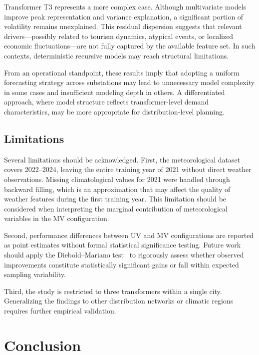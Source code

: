 Transformer T3 represents a more complex case. Although multivariate models improve peak representation and variance explanation, a significant portion of volatility remains unexplained. This residual dispersion suggests that relevant drivers—possibly related to tourism dynamics, atypical events, or localized economic fluctuations—are not fully captured by the available feature set. In such contexts, deterministic recursive models may reach structural limitations.

From an operational standpoint, these results imply that adopting a uniform forecasting strategy across substations may lead to unnecessary model complexity in some cases and insufficient modeling depth in others. A differentiated approach, where model structure reflects transformer-level demand characteristics, may be more appropriate for distribution-level planning.

\subsection*{Limitations}

Several limitations should be acknowledged. First, the meteorological dataset covers 2022--2024, leaving the entire training year of 2021 without direct weather observations. Missing climatological values for 2021 were handled through backward filling, which is an approximation that may affect the quality of weather features during the first training year. This limitation should be considered when interpreting the marginal contribution of meteorological variables in the MV configuration.

Second, performance differences between UV and MV configurations are reported as point estimates without formal statistical significance testing. Future work should apply the Diebold--Mariano test~\cite{DieboldMariano1995} to rigorously assess whether observed improvements constitute statistically significant gains or fall within expected sampling variability.

Third, the study is restricted to three transformers within a single city. Generalizing the findings to other distribution networks or climatic regions requires further empirical validation.


\section{Conclusion}
\label{sec:conclusion}

